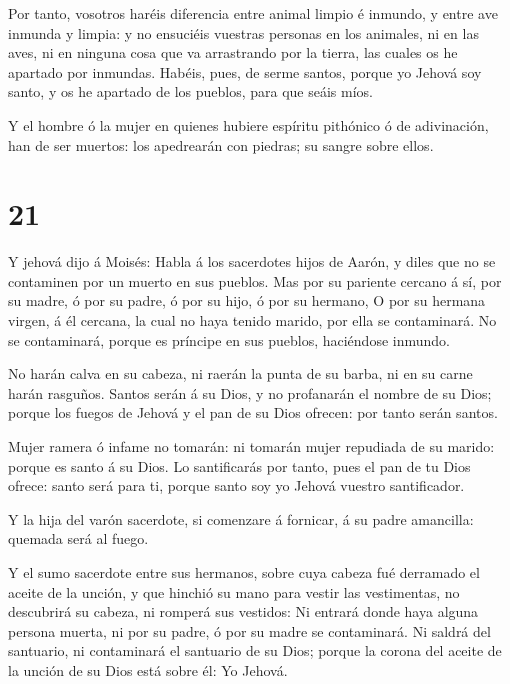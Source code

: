  Por tanto, vosotros haréis diferencia entre animal limpio
é inmundo, y entre ave inmunda y limpia: y no ensuciéis vuestras
personas en los animales, ni en las aves, ni en ninguna cosa que va
arrastrando por la tierra, las cuales os he apartado por inmundas.
 Habéis, pues, de serme santos, porque yo Jehová soy santo,
y os he apartado de los pueblos, para que seáis míos.

 Y el hombre ó la mujer en quienes hubiere espíritu
pithónico ó de adivinación, han de ser muertos: los apedrearán con
piedras; su sangre sobre ellos.

\hypertarget{section-20}{%
\section{21}\label{section-20}}

 Y jehová dijo á Moisés: Habla á los sacerdotes hijos de
Aarón, y diles que no se contaminen por un muerto en sus pueblos.
 Mas por su pariente cercano á sí, por su madre, ó por su
padre, ó por su hijo, ó por su hermano,  O por su hermana
virgen, á él cercana, la cual no haya tenido marido, por ella se
contaminará.  No se contaminará, porque es príncipe en sus
pueblos, haciéndose inmundo.

 No harán calva en su cabeza, ni raerán la punta de su
barba, ni en su carne harán rasguños.  Santos serán á su
Dios, y no profanarán el nombre de su Dios; porque los fuegos de Jehová
y el pan de su Dios ofrecen: por tanto serán santos.

 Mujer ramera ó infame no tomarán: ni tomarán mujer
repudiada de su marido: porque es santo á su Dios.  Lo
santificarás por tanto, pues el pan de tu Dios ofrece: santo será para
ti, porque santo soy yo Jehová vuestro santificador.

 Y la hija del varón sacerdote, si comenzare á fornicar, á
su padre amancilla: quemada será al fuego.

 Y el sumo sacerdote entre sus hermanos, sobre cuya cabeza
fué derramado el aceite de la unción, y que hinchió su mano para vestir
las vestimentas, no descubrirá su cabeza, ni romperá sus vestidos:
 Ni entrará donde haya alguna persona muerta, ni por su
padre, ó por su madre se contaminará.  Ni saldrá del
santuario, ni contaminará el santuario de su Dios; porque la corona del
aceite de la unción de su Dios está sobre él: Yo Jehová.

